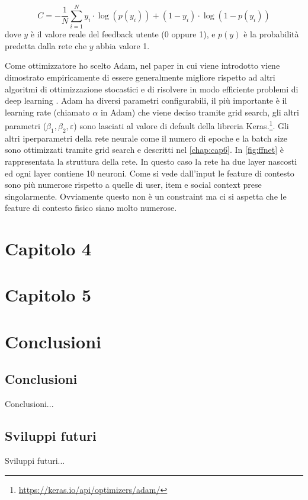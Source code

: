 \documentclass[12pt,italian]{report}
\begin{document}
$$
C = -\frac{1}{N} \sum_{i=1}^N y_i \cdot \log(p(y_i)) + (1-y_i) \cdot \log(1-p(y_i))
$$
dove $y$ è il valore reale del feedback utente (0 oppure 1), e $p(y)$ è la probabilità predetta dalla rete che $y$ abbia valore 1.

Come ottimizzatore ho scelto Adam, nel paper in cui viene introdotto viene dimostrato empiricamente di essere generalmente migliore rispetto ad altri algoritmi di ottimizzazione stocastici e di risolvere in modo efficiente problemi di deep learning \cite{adam}. Adam ha diversi parametri configurabili, il più importante è il learning rate (chiamato $\alpha$ in Adam) che viene deciso tramite grid search, gli altri parametri ($\beta_1, \beta_2, \varepsilon$) sono lasciati al valore di default della libreria Keras.\footnote{\url{https://keras.io/api/optimizers/adam/}}. Gli altri iperparametri della rete neurale come il numero di epoche e la batch size sono ottimizzati tramite grid search e descritti nel \autoref{chap:cap6}.
In \autoref{fig:ffnet} è rappresentata la struttura della rete. In questo caso la rete ha due layer nascosti ed ogni layer contiene 10 neuroni. Come si vede dall'input le feature di contesto sono più numerose rispetto a quelle di user, item e social context prese singolarmente. Ovviamente questo non è un constraint ma ci si aspetta che le feature di contesto fisico siano molto numerose.

% 
% 

\chapter{Capitolo 4}
\label{chap:datasets}


% 
% 

\chapter{Capitolo 5}
\label{chap:risultati}


% 
% 

\chapter{Conclusioni}
\label{chap:cap6}

\section{Conclusioni}

Conclusioni...

\section{Sviluppi futuri}

Sviluppi futuri...



%
%



\end{document}
